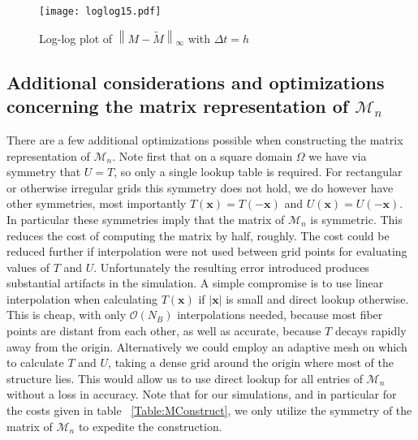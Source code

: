 \documentclass[preprint,12pt]{elsarticle}
\newcommand{\norm}[1]{\left\lVert#1\right\rVert}
\begin{document}
\begin{figure}[!b]
  \begin{center}
    \texttt{[image: loglog15.pdf]}
  \end{center}
  \caption{\small Log-log plot of $\norm{M-\tilde{M}}_\infty$ with $\Delta t = h$}
  \label{fig:loglog15}
\end{figure}

\subsection{Additional considerations and optimizations concerning the matrix representation of $\mathcal{M}_n$}
There are a few additional optimizations possible when constructing the matrix representation of $\mathcal{M}_n$.
Note first that on a square domain $\Omega$ we have via symmetry that $U=T$, so only a single lookup table is required.
For rectangular or otherwise irregular grids this symmetry does not hold, we do however have other symmetries, most importantly $T(\mathbf{x}) = T(-\mathbf{x})$ and $U(\mathbf{x}) = U(-\mathbf{x})$.
In particular these symmetries imply that the matrix of $\mathcal{M}_n$ is symmetric. This reduces the cost of computing the matrix by half, roughly. The cost could be reduced further if interpolation were not used between grid points for evaluating values of $T$ and $U$. Unfortunately the resulting error introduced produces substantial artifacts in the simulation. A simple compromise is to use linear interpolation when calculating $T(\mathbf{x})$ if $|\mathbf{x}|$ is small and direct lookup otherwise. This is cheap, with only $\mathcal{O}(N_B)$ interpolations needed, because most fiber points are distant from each other, as well as accurate, because $T$ decays rapidly away from the origin. Alternatively we could employ an adaptive mesh on which to calculate $T$ and $U$, taking a dense grid around the origin where most of the structure lies. This would allow us to use direct lookup for all entries of $\mathcal{M}_n$ without a loss in accuracy. Note that for our simulations, and in particular for the costs given in table ~\ref{Table:MConstruct}, we only utilize the symmetry of the matrix of $\mathcal{M}_n$ to expedite the construction.
\end{document}
